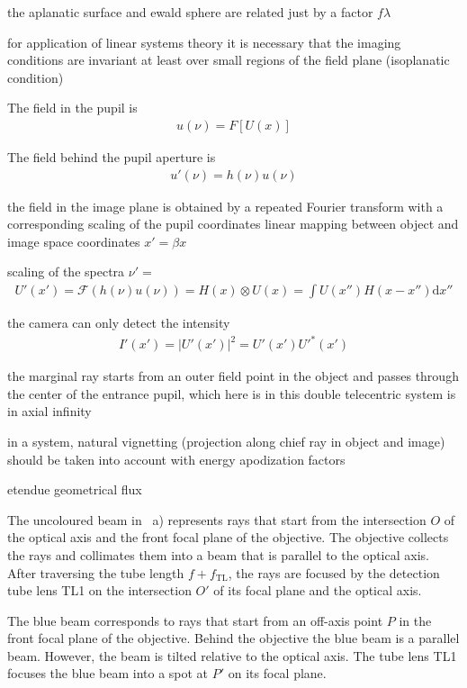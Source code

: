 the aplanatic surface and ewald sphere are related just by a factor
$f\lambda$

for application of linear systems theory it is necessary that the
imaging conditions are invariant at least over small regions of the
field plane (isoplanatic condition)

The field in the pupil is
\begin{align}
u(\nu)=F\left[U(x)\right]
\end{align}


The field behind the pupil aperture is
\begin{align}
u'(\nu)=h(\nu) u(\nu)
\end{align}

the field in the image plane is obtained by a repeated Fourier
transform with a corresponding scaling of the pupil coordinates
linear mapping between object and image space coordinates $x'=\beta x$

scaling of the spectra $\nu'=$
\begin{align}
U'(x')=\mathcal{F}(h(\nu) u(\nu)) = H(x) \otimes U(x) = \int U(x'') H(x-x'') \textrm{d}x''
\end{align}

the camera can only detect the intensity
\begin{align}
I'(x')=|U'(x')|^2=U'(x')U'^*(x')
\end{align}

the marginal ray starts from an outer field point in the object and
passes through the center of the entrance pupil, which here is in
this double telecentric system is in axial infinity 

in a system, natural vignetting (projection along chief ray in object
and image) should be taken into account with energy apodization
factors

etendue
geometrical flux



The uncoloured beam in ~a) represents
rays that start from the intersection $O$ of the optical axis and the
front focal plane of the objective. The objective collects the rays
and collimates them into a beam that is parallel to the optical
axis. After traversing the tube length $f+f_\mathrm{TL}$, the rays are
focused by the detection tube lens TL1 on the intersection $O'$ of its
focal plane and the optical axis. 

The blue beam corresponds to rays that start from an off-axis point
$P$ in the front focal plane of the objective. Behind the objective
the blue beam is a parallel beam. However, the beam is tilted relative
to the optical axis. The tube lens TL1 focuses the blue beam into a
spot at $P'$ on its focal plane.

